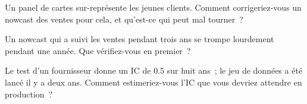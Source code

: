 \begin{interviewq}\label{iq:ml:alternative-data-pipelines:4}
Un panel de cartes sur-représente les jeunes clients. Comment corrigeriez-vous un nowcast des ventes pour cela, et qu'est-ce qui peut mal tourner~?
\end{interviewq}

\begin{interviewq}\label{iq:ml:alternative-data-pipelines:5}
Un nowcast qui a suivi les ventes pendant trois ans se trompe lourdement pendant une année. Que vérifiez-vous en premier~?
\end{interviewq}

\begin{interviewq}\label{iq:ml:alternative-data-pipelines:6}
Le test d'un fournisseur donne un IC de 0.5 sur huit ans~; le jeu de données a été lancé il y a deux ans. Comment estimeriez-vous l'IC
que vous devriez attendre en production~?
\end{interviewq}
